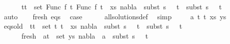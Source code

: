 \begin{isabellebody}
\ \ \ \ \ {\isachardoublequoteopen}{\isasymforall}\ {\isacharparenleft}{\kern0pt}t{}{\isacharcomma}{\kern0pt}t{}{\isacharparenright}{\kern0pt}\ {\isasymin}\ set\ {\isacharparenleft}{\kern0pt}{\isacharparenleft}{\kern0pt}Func\ f\ t{}{\isacharcomma}{\kern0pt}\ Func\ f\ t{}{\isacharparenright}{\kern0pt}\ {\isacharhash}{\kern0pt}\ xs{\isacharparenright}{\kern0pt}{\isachardot}{\kern0pt}\ nabla{}\ {\isasymturnstile}\ subst\ {\isacharparenleft}{\kern0pt}s{}\ {\isasymbullet}\ {\isacharbrackleft}{\kern0pt}{\isacharbrackright}{\kern0pt}{\isacharparenright}{\kern0pt}\ t{}\ {\isasymapprox}\ subst\ {\isacharparenleft}{\kern0pt}s{}\ {\isasymbullet}\ {\isacharbrackleft}{\kern0pt}{\isacharbrackright}{\kern0pt}{\isacharparenright}{\kern0pt}\ t{}{\isachardoublequoteclose}\isanewline
\ \ \ \ \ \isamarkupfalse%
\ auto\isanewline
\ \ \isamarkupfalse%
\ fresh\ eqs\ \isamarkupfalse%
\ {\isacharquery}{\kern0pt}case\isanewline
\ \ \ \ \isamarkupfalse%
\ all{\isacharunderscore}{\kern0pt}solutions{\isacharunderscore}{\kern0pt}def\ \isamarkupfalse%
\ simp\isanewline
{}\isamarkupfalse%
\isanewline
\ \ \isamarkupfalse%
\ {\isacharparenleft}{\kern0pt}{}\ a\ t{}\ t{}\ xs\ ys{\isacharparenright}{\kern0pt}\isanewline
\ \ \isamarkupfalse%
\ eqs{\isacharunderscore}{\kern0pt}old{\isacharcolon}{\kern0pt}\ {\isachardoublequoteopen}{\isasymforall}\ {\isacharparenleft}{\kern0pt}t{}{\isacharcomma}{\kern0pt}t{}{\isacharparenright}{\kern0pt}\ {\isasymin}\ set\ {\isacharparenleft}{\kern0pt}{\isacharparenleft}{\kern0pt}t{}{\isacharcomma}{\kern0pt}\ t{}{\isacharparenright}{\kern0pt}\ {\isacharhash}{\kern0pt}\ xs{\isacharparenright}{\kern0pt}{\isachardot}{\kern0pt}\ nabla{}\ {\isasymturnstile}\ subst\ {\isacharparenleft}{\kern0pt}s{}\ {\isasymbullet}\ {\isacharbrackleft}{\kern0pt}{\isacharbrackright}{\kern0pt}{\isacharparenright}{\kern0pt}\ t{}\ {\isasymapprox}\ subst\ {\isacharparenleft}{\kern0pt}s{}\ {\isasymbullet}\ {\isacharbrackleft}{\kern0pt}{\isacharbrackright}{\kern0pt}{\isacharparenright}{\kern0pt}\ t{}{\isachardoublequoteclose}\ \isanewline
\ \ \ \ \ \ fresh{\isacharcolon}{\kern0pt}\ {\isachardoublequoteopen}{\isasymforall}\ {\isacharparenleft}{\kern0pt}a{\isacharcomma}{\kern0pt}t{\isacharparenright}{\kern0pt}\ {\isasymin}\ set\ ys{\isachardot}{\kern0pt}\ nabla{}\ {\isasymturnstile}\ a\ {\isasymsharp}\ subst\ {\isacharparenleft}{\kern0pt}s{}\ {\isasymbullet}\ {\isacharbrackleft}{\kern0pt}{\isacharbrackright}{\kern0pt}{\isacharparenright}{\kern0pt}\ t{\isachardoublequoteclose}\isanewline

\end{isabellebody}
